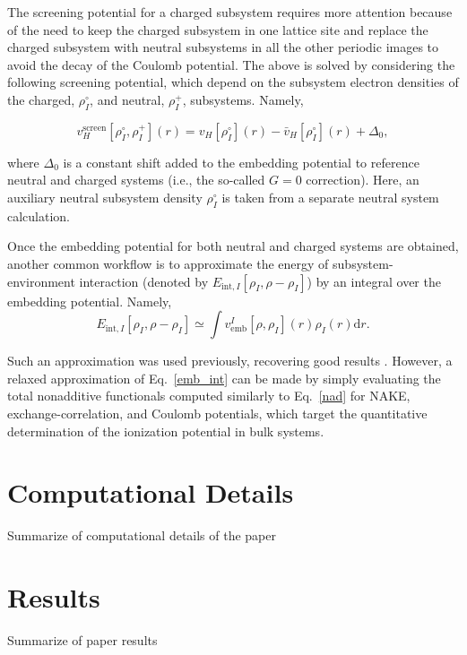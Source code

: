 \documentclass[notitlepage,12pt]{report}
\begin{document}
	The screening potential for a charged subsystem requires more attention because of the need to keep the charged subsystem in one lattice site and replace the charged subsystem with neutral subsystems in all the other periodic images to avoid the decay of the Coulomb potential. The above is solved by considering the following screening potential, which depend on the subsystem electron densities of the charged, $\rho_I^\circ$, and neutral, $\rho_I^+$, subsystems. Namely,
	
	\begin{equation}
		\label{sc2}
		v^{\mathrm{screen}}_H[\rho_I^\circ,\rho_I^+](r) = v_H[\rho_I^\circ](r) - \bar{v}_H[\rho_I^\circ](r) + \Delta_0,
	\end{equation}
	
	where $\Delta_0$ is a constant shift added to the embedding potential to reference neutral and charged systems (i.e., the so-called $G=0$ correction\supercite{duan2000ewald}). Here, an auxiliary neutral subsystem density $\rho_I^\circ$ is taken from a separate neutral system calculation. 
	
	Once the embedding potential for both neutral and charged systems are obtained, another common workflow is to approximate the energy of subsystem-environment interaction (denoted by $E_{\mathrm{int},I}[\rho_{I},\rho-\rho_{I}]$) by an integral over the embedding potential. Namely, 
	\begin{equation}\label{emb_int}
		E_{\mathrm{int},I}[\rho_{I},\rho-\rho_{I}] \simeq \int v^I_{\mathrm{emb}}[\rho, \rho_I](r)  \rho_{I}(r) \mathrm{d} r.
	\end{equation}
	
	Such an approximation was used previously, recovering good results \supercite{tolle2019charged}. However, a relaxed approximation of Eq.\ \ref{emb_int} can be made by simply evaluating the total nonadditive functionals computed similarly to Eq.\ \ref{nad} for NAKE, exchange-correlation, and Coulomb potentials, which target the quantitative determination of the ionization potential in bulk systems.

\section{Computational Details}
	Summarize of computational details of the paper
\section{Results}
	Summarize of paper results
	
\end{document}
